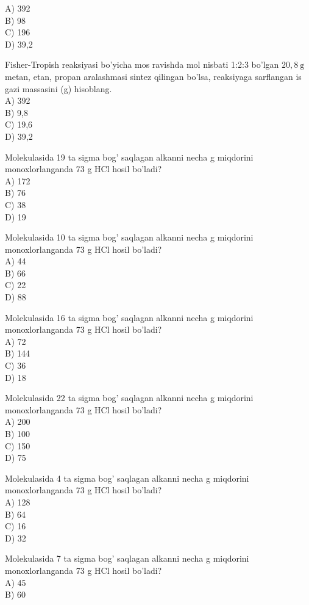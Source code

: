 A) 392\\
B) 98\\
C) 196\\
D) 39,2
  \item Fisher-Tropish reaksiyasi bo'yicha mos ravishda mol nisbati 1:2:3 bo'lgan $20,8 \mathrm{~g}$ metan, etan, propan aralashmasi sintez qilingan bo'lsa, reaksiyaga sarflangan is gazi massasini (g) hisoblang.\\
A) 392\\
B) 9,8\\
C) 19,6\\
D) 39,2
  \item Molekulasida 19 ta sigma bog' saqlagan alkanni necha g miqdorini monoxlorlanganda 73 g HCl hosil bo'ladi?\\
A) 172\\
B) 76\\
C) 38\\
D) 19
  \item Molekulasida 10 ta sigma bog' saqlagan alkanni necha g miqdorini monoxlorlanganda 73 g HCl hosil bo'ladi?\\
A) 44\\
B) 66\\
C) 22\\
D) 88
  \item Molekulasida 16 ta sigma bog' saqlagan alkanni necha g miqdorini monoxlorlanganda 73 g HCl hosil bo'ladi?\\
A) 72\\
B) 144\\
C) 36\\
D) 18
  \item Molekulasida 22 ta sigma bog' saqlagan alkanni necha g miqdorini monoxlorlanganda 73 g HCl hosil bo'ladi?\\
A) 200\\
B) 100\\
C) 150\\
D) 75
  \item Molekulasida 4 ta sigma bog' saqlagan alkanni necha g miqdorini monoxlorlanganda 73 g HCl hosil bo'ladi?\\
A) 128\\
B) 64\\
C) 16\\
D) 32
  \item Molekulasida 7 ta sigma bog' saqlagan alkanni necha g miqdorini monoxlorlanganda 73 g HCl hosil bo'ladi?\\
A) 45\\
B) 60\\

